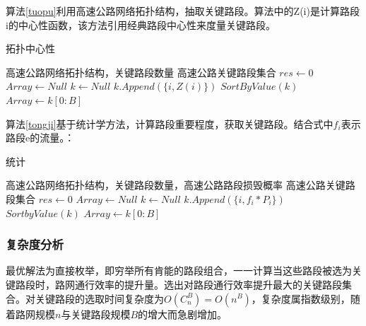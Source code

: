     	算法\ref{tuopu}利用高速公路网络拓扑结构，抽取关键路段。算法中的Z(i)是计算路段i的中心性函数\parencite{Phillip1972Factoring}，该方法引用经典路段中心性来度量关键路段。

    	\begin{algorithm}[!h]
        \caption{拓扑中心性}  
        \label{tuopu}
        \begin{algorithmic}[1] %
            \Require 高速公路网络拓扑结构，关键路段数量
            \Ensure 高速公路关键路段集合
                \State $res\gets 0$  
                \State $Array\gets Null$  
                \State $k\gets Null$ 
                		\State $k.Append(\{i,Z(i)\})$ 
                	\EndFor  
                \State $SortByValue(k)$
                \State $Array\gets k[0:B]$
                \State {}  
            \EndFunction  
        \end{algorithmic}  
    	\end{algorithm} 

    	算法\ref{tongji}基于统计学方法，计算路段重要程度，获取关键路段。结合式中$f_i$表示路段e的流量。：

    	\begin{algorithm}[!h]
        \caption{统计}  
        \label{tongji}
        \begin{algorithmic}[1] %
            \Require 高速公路网络拓扑结构，关键路段数量，高速公路路段损毁概率
            \Ensure 高速公路关键路段集合
                \State $res\gets 0$  
                \State $Array\gets Null$  
                \State $k\gets Null$ 
                	\State $k.Append( \{i,f_i*P_i\})$
                \EndFor  
                \State $SortbyValue(k)$
                \State $Array\gets k[0:B]$
                \State {}  
            \EndFunction  
        \end{algorithmic}  
    	\end{algorithm} 

		\subsubsection{复杂度分析}
			最优解法为直接枚举，即穷举所有肯能的路段组合，一一计算当这些路段被选为关键路段时，路网通行效率的提升量。选出对路段通行效率提升最大的关键路段集合。对关键路段的选取时间复杂度为$O(C_n^B)=O(n^B)$，复杂度属指数级别，随着路网规模$n$与关键路段规模$B$的增大而急剧增加。

